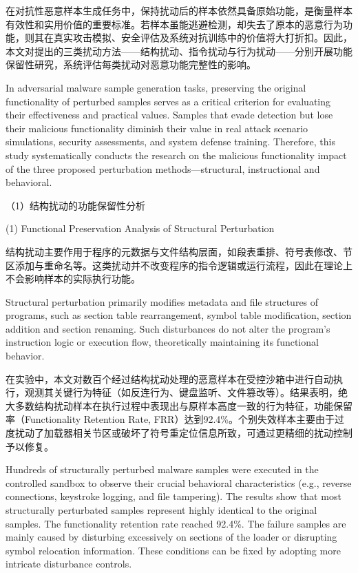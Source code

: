 在对抗性恶意样本生成任务中，保持扰动后的样本依然具备原始功能，是衡量样本有效性和实用价值的重要标准。若样本虽能逃避检测，却失去了原本的恶意行为功能，则其在真实攻击模拟、安全评估及系统对抗训练中的价值将大打折扣。因此，本文对提出的三类扰动方法——结构扰动、指令扰动与行为扰动——分别开展功能保留性研究，系统评估每类扰动对恶意功能完整性的影响。

In adversarial malware sample generation tasks, preserving the original functionality of perturbed samples serves as a critical criterion for evaluating their effectiveness and practical values. Samples that evade detection but lose their malicious functionality diminish their value in real attack scenario simulations, security assessments, and system defense training. Therefore, this study systematically conducts the research on the malicious functionality impact of the three proposed perturbation methods—structural, instructional and behavioral.

（1）结构扰动的功能保留性分析

(1) Functional Preservation Analysis of Structural Perturbation

结构扰动主要作用于程序的元数据与文件结构层面，如段表重排、符号表修改、节区添加与重命名等。这类扰动并不改变程序的指令逻辑或运行流程，因此在理论上不会影响样本的实际执行功能。

Structural perturbation primarily modifies metadata and file structures of programs, such as section table rearrangement, symbol table modification, section addition and section renaming. Such disturbances do not alter the program's instruction logic or execution flow, theoretically maintaining its functional behavior.

在实验中，本文对数百个经过结构扰动处理的恶意样本在受控沙箱中进行自动执行，观测其关键行为特征（如反连行为、键盘监听、文件篡改等）。结果表明，绝大多数结构扰动样本在执行过程中表现出与原样本高度一致的行为特征，功能保留率（Functionality Retention Rate, FRR）达到92.4\%。个别失效样本主要由于过度扰动了加载器相关节区或破坏了符号重定位信息所致，可通过更精细的扰动控制予以修复。

Hundreds of structurally perturbed malware samples were executed in the controlled sandbox to observe their crucial behavioral characteristics (e.g., reverse connections, keystroke logging, and file tampering). The results show that most structurally perturbated samples represent highly identical to the original samples. The functionality retention rate reached 92.4\%. The failure samples are mainly caused by disturbing excessively on sections of the loader or disrupting symbol relocation information. These conditions can be fixed by adopting more intricate disturbance controls.

